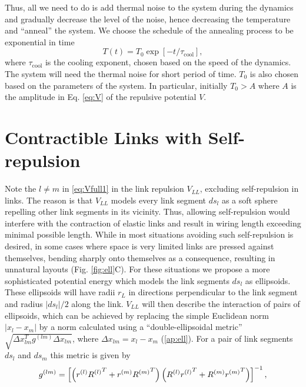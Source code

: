 \documentclass[endfloats,nofootinbib,preprint,floatfix,titlepage,superscriptaddress]{revtex4} %
\begin{document}
Thus, all we need to do is add thermal noise to the system during the dynamics and gradually decrease the level of the noise, hence decreasing the temperature and ``anneal'' the system. We choose the schedule of the annealing process to be exponential in time
\begin{equation}
T(t) = T_0 \exp[-t/\tau_{\mathrm{cool}}], \label{eq:coolexp}
\end{equation}
where $\tau_{\mathrm{cool}}$ is the cooling exponent, chosen based on the speed of the dynamics. The system will need the thermal noise for short period of time. $T_0$ is also chosen based on the parameters of the system. In particular, initially $T_0 > A$ where $A$ is the amplitude in Eq. \eqref{eq:V} of the repulsive potential $V$.   



\section{Contractible Links with Self-repulsion\label{ap:ell}}
Note the $l\ne m $ in \eqref{eq:Vfull1} in the link repulsion $V_{LL}$, excluding self-repulsion in links. 
The reason is that $V_{LL}$ models every link segment $ds_l$ as a soft sphere repelling other link segments in its vicinity.
Thus, allowing self-repulsion would interfere with the contraction of elastic links and result in wiring length exceeding minimal possible length. 
While in most situations avoiding such self-repulsion is desired, in some cases where space is very limited links are pressed against themselves, bending sharply onto themselves as a consequence, resulting in unnatural layouts (Fig. \ref{fig:ell}C).  
For these situations we propose a more sophisticated potential energy which models the link segments $ds_l$ as ellipsoids. 
These ellipsoids will have radii $r_L$ in directions perpendicular to the link segment and radius $|ds_l|/2$ along the link. 
$V_{LL}$ will then describe the interaction of pairs of ellipsoids, which can be achieved by replacing the simple Euclidean norm $|x_l-x_m|%
$ by a norm calculated using a ``double-ellipsoidal metric'' $\sqrt{\Delta x_{lm}^Tg^{(lm)}\Delta x_{lm}}$, where $\Delta x_{lm} = x_l-x_m$ (\ref{ap:ell}). 
For a pair of link segments $ds_l$ and $ds_m$ this metric is given by 
\begin{align}
    g^{(lm)} = \left[\left(r^{(l)}{R^{(l)}}^T+ r^{(m)}{R^{(m)}}^T\right) \left(R^{(l)}{r^{(l)}}^T+ R^{(m)}{r^{(m)}}^T\right) \right]^{-1},
    \label{eq:g-ell}
\end{align}
\end{document}
